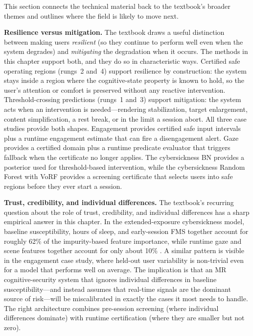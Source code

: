 \documentclass[graybox]{svmult}
\begin{document}
This section connects the technical material back to the textbook's broader themes and outlines where the field is likely to move next.

\textbf{Resilience versus mitigation.} The textbook draws a useful distinction between making users \emph{resilient} (so they continue to perform well even when the system degrades) and \emph{mitigating} the degradation when it occurs. The methods in this chapter support both, and they do so in characteristic ways. Certified safe operating regions (rungs~2 and~4) support resilience by construction: the system stays inside a region where the cognitive-state property is known to hold, so the user's attention or comfort is preserved without any reactive intervention. Threshold-crossing predictions (rungs~1 and~3) support mitigation: the system acts when an intervention is needed---rendering stabilization, target enlargement, content simplification, a rest break, or in the limit a session abort. All three case studies provide both shapes. Engagement provides certified safe input intervals plus a runtime engagement estimate that can fire a disengagement alert. Gaze provides a certified domain plus a runtime predicate evaluator that triggers fallback when the certificate no longer applies. The cybersickness BN provides a posterior used for threshold-based intervention, while the cybersickness Random Forest with VoRF provides a screening certificate that selects users into safe regions before they ever start a session.

\textbf{Trust, credibility, and individual differences.} The textbook's recurring question about the role of trust, credibility, and individual differences has a sharp empirical answer in this chapter. In the extended-exposure cybersickness model, baseline susceptibility, hours of sleep, and early-session FMS together account for roughly 62\% of the impurity-based feature importance, while runtime gaze and scene features together account for only about 10\% \citep{cybersickness2025extended}. A similar pattern is visible in the engagement case study, where held-out user variability is non-trivial even for a model that performs well on average. The implication is that an MR cognitive-security system that ignores individual differences in baseline susceptibility---and instead assumes that real-time signals are the dominant source of risk---will be miscalibrated in exactly the cases it most needs to handle. The right architecture combines pre-session screening (where individual differences dominate) with runtime certification (where they are smaller but not zero).
\end{document}
